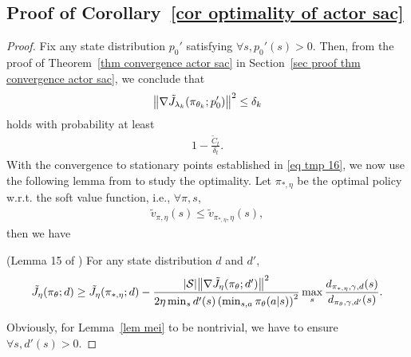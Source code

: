 \documentclass[twoside,11pt]{article}
\newcommand{\fS}{\mathcal{S}}
\newcommand{\ns}{{|\fS|}}
\numberwithin{assucounter}{section}
\begin{document}
\subsection{Proof of Corollary~\ref{cor optimality of actor sac}}
\label{sec proof cor optimality of actor sac}
\coroptimalityofactorsac*
\begin{proof}
  Fix any state distribution $p_0'$ satisfying $\forall s, p_0'(s) > 0$. 
  Then, from the proof of Theorem~\ref{thm convergence actor sac} in Section~\ref{sec proof thm convergence actor sac}, we conclude that
  \begin{align}
    \label{eq tmp 16}
    \norm{\nabla \tilde J_{\lambda_k}(\pi_{\theta_k}; p_0')}^2 \leq \delta_k
  \end{align}
  holds with probability at least
  \begin{align}
    1 - \frac{\tilde C_t}{\delta_t}.
  \end{align}
  With the convergence to stationary points established in \eqref{eq tmp 16}, 
  we now use the following lemma from \citet{mei2020global} to study the optimality. 
  Let $\pi_{*, \eta}$ be the optimal policy w.r.t. the soft value function, i.e., $\forall \pi, s$,
  \begin{align}
    \tilde v_{\pi, \eta}(s) \leq \tilde v_{\pi_{*, \eta}, \eta}(s),
  \end{align}
  then we have
  \begin{lemma}
    \label{lem mei}
    (Lemma 15 of \citet{mei2020global})
    For any state distribution $d$ and $d'$,
    \begin{align}
      \tilde J_{\eta}(\pi_\theta; d) \geq \tilde J_{\eta}(\pi_{*, \eta}; d) - \frac{\ns \norm{\nabla \tilde J_\eta(\pi_\theta; d')}^2}{2 \eta \min_s d'(s) \left(\min_{s,a} \pi_\theta(a|s)\right)^2} \max_s \frac{d_{\pi_{*,\eta}, \gamma, d}(s)}{d_{\pi_\theta, \gamma, d'}(s)}.
    \end{align} 
  \end{lemma}
  Obviously, for Lemma~\ref{lem mei} to be nontrivial, 
  we have to ensure $\forall s, d'(s) > 0$.


\end{proof}
\end{document}
